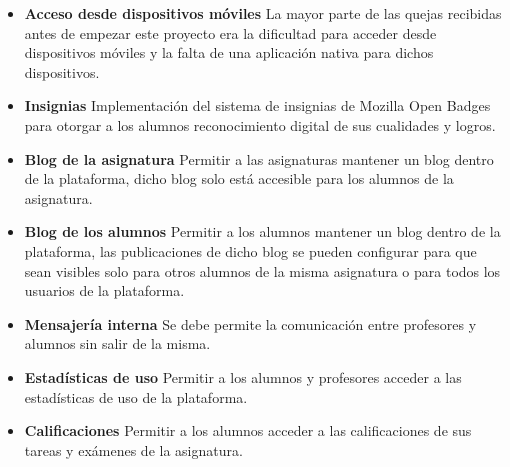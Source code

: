 \begin{enumerate}
  		\begin{itemize}
  			\item \textbf{Acceso desde dispositivos móviles} La mayor parte de las quejas recibidas antes de empezar este proyecto era la dificultad para acceder desde dispositivos móviles y la falta de una aplicación nativa para dichos dispositivos.
  			\item \textbf{Insignias} Implementación del sistema de insignias de Mozilla Open Badges para otorgar a los alumnos reconocimiento digital de sus cualidades y logros.
  			\item \textbf{Blog de la asignatura} Permitir a las asignaturas mantener un blog dentro de la plataforma, dicho blog solo está accesible para los alumnos de la asignatura.
  			\item \textbf{Blog de los alumnos} Permitir a los alumnos mantener un blog dentro de la plataforma, las publicaciones de dicho blog se pueden configurar para que sean visibles solo para otros alumnos de la misma asignatura o para todos los usuarios de la plataforma.
  			\item \textbf{Mensajería interna} Se debe permite la comunicación entre profesores y alumnos sin salir de la misma.
  			\item \textbf{Estadísticas de uso} Permitir a los alumnos y profesores acceder a las estadísticas de uso de la plataforma.
  			\item \textbf{Calificaciones} Permitir a los alumnos acceder a las calificaciones de sus tareas y exámenes de la asignatura.

		\end{itemize}




\end{enumerate}
